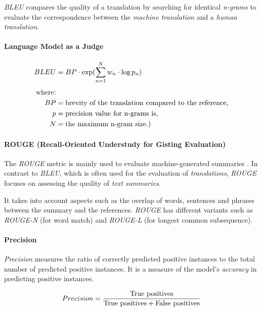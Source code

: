 \documentclass{article}
\begin{document}
\textit{BLEU} compares the quality of a translation by searching for identical \textit{n-grams} to evaluate the correspondence between the \textit{machine translation} and a \textit{human translation}.

\paragraph{Language Model as a Judge}

\begin{align}
\begin{split}
	BLEU &= BP \cdot \exp(\sum_{n=1}^{N}{w_n\cdot\log p_{n}})\\[0.25\baselineskip]
	\text{where:}\\ 
    BP &= \text{brevity of the translation compared to the reference,}\\
	p &= \text{precision value for n-grams is,}\\ 
	N &= \text{the maximum n-gram size.)}
\end{split}
\end{align}

\paragraph{ROUGE (Recall-Oriented Understudy for Gisting Evaluation)}
The \textit{ROUGE} metric is mainly used to evaluate machine-generated summaries \cite{ROUGE}. In contrast to \textit{BLEU}, which is often used for the evaluation of \textit{translations}, \textit{ROUGE} focuses on assessing the quality of \textit{text summaries}.

 It takes into account aspects such as the overlap of words, sentences and phrases between the summary and the references. \textit{ROUGE} has different variants such as \textit{ROUGE-N} (for word match) and \textit{ROUGE-L} (for longest common subsequence).

\paragraph{Precision} 
\textit{Precision} measures the ratio of correctly predicted positive instances to the total number of predicted positive instances. It is a measure of the model's \textit{accuracy} in predicting positive instances.

\begin{align}
\begin{split}
	Precision &= \frac{\text{True positives}}{\text{True positives} + \text{False positives}}\\[0.25\baselineskip]
\end{split}
\end{align}
\end{document}
